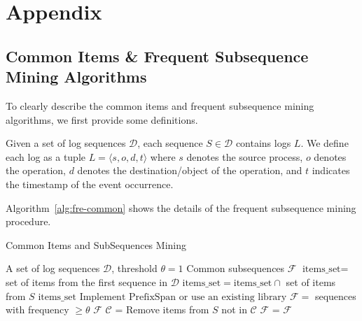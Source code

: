 \newpage
\section{Appendix}

\subsection{Common Items \& Frequent Subsequence Mining Algorithms}
\label{sec:com-seq}

To clearly describe the common items and frequent subsequence mining algorithms, we first provide some definitions.

Given a set of log sequences \( \mathcal{D} \), each sequence \( S \in \mathcal{D} \) contains logs \( L \). We define each log as a tuple $ L = \langle s, o, d,t\rangle $ where $s$ denotes the source process, $o$ denotes the operation, $d$ denotes the destination/object of the operation, and $t$ indicates the timestamp of the event occurrence.  

Algorithm~\ref{alg:fre-common} shows the details of the frequent subsequence mining procedure.

\begin{algorithm}
\caption{Common Items and SubSequences Mining}
\label{alg:fre-common}
\begin{algorithmic}[1]
\Require A set of log sequences \( \mathcal{D} \), threshold \( \theta=1 \)
\Ensure Common subsequences \( \mathcal{F} \)
\Statex
{}
    \State \( \text{items\_set} = \) set of items from the first sequence in \( \mathcal{D} \)
        \State \( \text{items\_set} = \text{items\_set} \cap \) set of items from \(S\)
    \EndFor
    \State \Return \( \text{items\_set} \) 
\EndFunction
\Statex
{}
    \State \( \text{Implement PrefixSpan or use an existing library} \)
    \State \( \mathcal{F} = \) sequences with frequency \( \geq \theta \)
    \State \Return \( \mathcal{F} \)
\EndFunction
\Statex
{}
    \State \( \mathcal{C} \) = 
        \State Remove items from \(S\) not in \( \mathcal{C} \)
    \EndFor
    \State \( \mathcal{F} \) = 
    \State \Return \( \mathcal{F} \)
\EndFunction
\end{algorithmic}
\end{algorithm}

